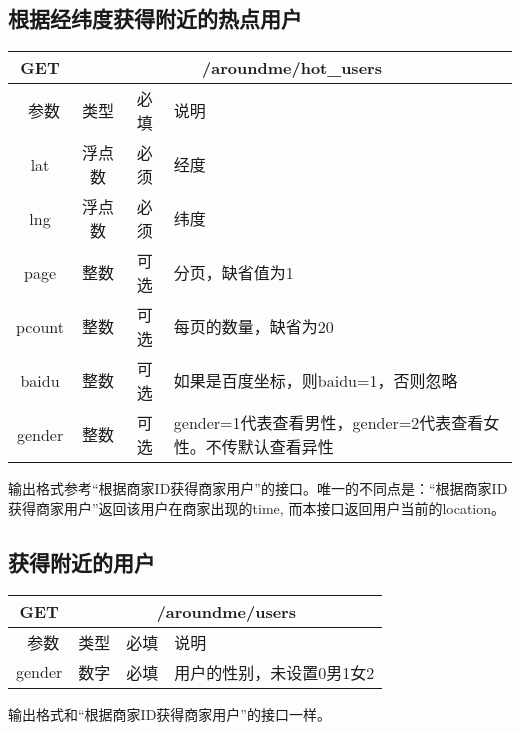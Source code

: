 \documentclass[cs4size]{ctexartutf8}
\begin{document}
\subsection{根据经纬度获得附近的热点用户}

\begin{table}[H]
   \begin{center}
\begin{tabular}{|c|c|c|p{12cm}|}
\hline
GET & \multicolumn{3}{|c|}{/aroundme/hot\_users} \\
\hline\hline
 \  参数  & 类型 & 必填 &  说明  \\
\hline
 lat  & 浮点数 & 必须 & 经度\\
\hline
 lng  &  浮点数 & 必须 & 纬度\\ 
  \hline
 page  & 整数 & 可选 & 分页，缺省值为1\\ 
 \hline
 pcount  & 整数 & 可选 & 每页的数量，缺省为20\\ 
\hline
 baidu  & 整数 & 可选 & 如果是百度坐标，则baidu=1，否则忽略\\  
 \hline
 gender  & 整数 & 可选 & gender=1代表查看男性，gender=2代表查看女性。不传默认查看异性\\  
\hline
\end{tabular}
   \end{center}
\end{table}

输出格式参考“根据商家ID获得商家用户”的接口。唯一的不同点是：“根据商家ID获得商家用户”返回该用户在商家出现的time, 而本接口返回用户当前的location。




\subsection{获得附近的用户}

\begin{table}[H]
   \begin{center}
\begin{tabular}{|c|c|c|p{12cm}|}
\hline
GET & \multicolumn{3}{|c|}{/aroundme/users} \\
\hline\hline
 \  参数  & 类型 & 必填 &  说明  \\
 \hline
 gender  & 数字 & 必填 &  用户的性别，未设置0男1女2\\
\hline
\end{tabular}
   \end{center}
\end{table}

输出格式和“根据商家ID获得商家用户”的接口一样。
\end{document}
